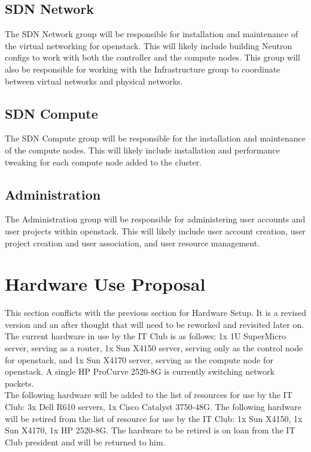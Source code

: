 \documentclass[12pt]{article}
\begin{document}
\subsection{SDN Network}
The SDN Network group will be responsible for installation and maintenance of the virtual networking for openstack. This will likely include
building Neutron configs to work with both the controller and the compute nodes. This group will also be responsible for working with the
Infrastructure group to coordinate between virtual networks and physical networks.

\subsection{SDN Compute}
The SDN Compute group will be responsible for the installation and maintenance of the compute nodes. This will likely include installation
and performance tweaking for each compute node added to the cluster. 

\subsection{Administration}
The Administration group will be responsible for administering user accounts and user projects within openstack. This will likely include
user account creation, user project creation and user association, and user resource management.

\section{Hardware Use Proposal}
This section conflicts with the previous section for Hardware Setup. It is a revised version and an after thought that will need to be reworked 
and revisited later on.
\\

The current hardware in use by the IT Club is as follows: 1x 1U SuperMicro server, serving as a router, 1x Sun X4150 server, serving only as
the control node for openstack, and 1x Sun X4170 server, serving as the compute node for openstack. A single HP ProCurve 2520-8G is currently 
switching network packets.
\\

The following hardware will be added to the list of resources for use by the IT Club: 3x Dell R610 servers, 1x Cisco Catalyst 3750-48G.
The following hardware will be retired from the list of resource for use by the IT Club: 1x Sun X4150, 1x Sun X4170, 1x HP 2520-8G. The hardware
to be retired is on loan from the IT Club president and will be returned to him.
\end{document}
